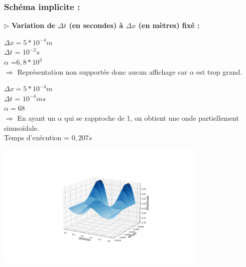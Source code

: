 \subsubsection{Schéma implicite :}

$\triangleright$ \textbf{Variation de $\Delta t$ (en secondes) à $\Delta x$ (en mètres) fixé :}\\
\begin{enumerate}[label=\alph*)]


\begin{minipage}{.5\textwidth}%

\item $\Delta x =  5*{10}^{-4}m$\\
$\Delta t$ = ${10}^{-2} s $\\
$\alpha$ =$6,8*{10}^{3}$\\

$\Longrightarrow$ Représentation non supportée donc aucun affichage car $\alpha$ est trop grand.\\ 

\end{minipage}%




\begin{minipage}{.5\textwidth}%
\item $\Delta x = 5*{10}^{-4}m $\\
$\Delta t$ = ${10}^{-4}m s $ \\
$\alpha =68$ \\

$\Longrightarrow$ En ayant un $\alpha$ qui se rapproche de 1, on obtient une onde partiellement sinusoïdale.\\
Temps d'exécution = $0,207s$

\end{minipage}%
\hfill
\begin{minipage}{.45\textwidth}%
\includegraphics[width=10cm,height=6cm]{implicitec.png}
\end{minipage}%


\end{enumerate}
